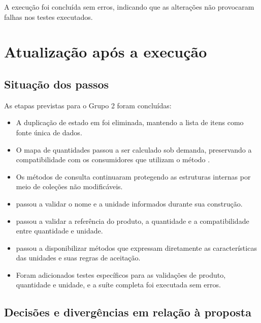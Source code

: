 A execução foi concluída sem erros, indicando que as alterações não provocaram falhas nos testes executados.

\section{Atualização após a execução}

\subsection{Situação dos passos}

As etapas previstas para o Grupo 2 foram concluídas:

\begin{itemize}

\item A duplicação de estado em  foi eliminada, mantendo a lista de itens como fonte única de dados.

\item O mapa de quantidades passou a ser calculado sob demanda, preservando a compatibilidade com os consumidores que utilizam o método .

\item Os métodos de consulta continuaram protegendo as estruturas internas por meio de coleções não modificáveis.

\item {} passou a validar o nome e a unidade informados durante sua construção.

\item {} passou a validar a referência do produto, a quantidade e a compatibilidade entre quantidade e unidade.

\item {} passou a disponibilizar métodos que expressam diretamente as características das unidades e suas regras de aceitação.

\item Foram adicionados testes específicos para as validações de produto, quantidade e unidade, e a suíte completa foi executada sem erros.

\end{itemize}

\subsection{Decisões e divergências em relação à proposta}

